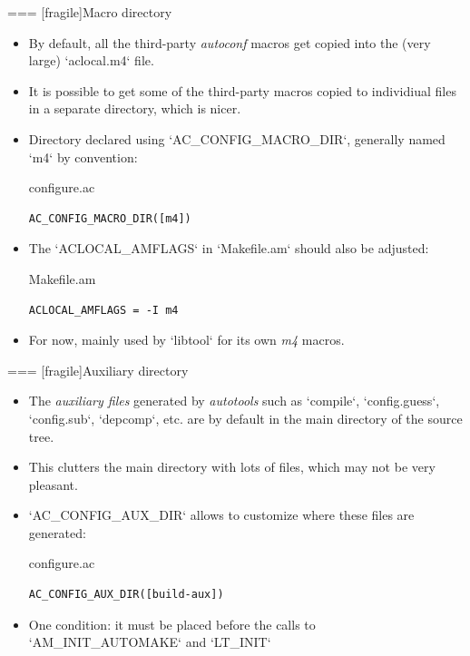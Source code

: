 === [fragile]{Macro directory}

  \begin{itemize}

  \item By default, all the third-party {\em autoconf} macros get
    copied into the (very large) `aclocal.m4` file.

  \item It is possible to get some of the third-party macros copied to
    individiual files in a separate directory, which is nicer.

  \item Directory declared using `AC_CONFIG_MACRO_DIR`, generally
    named `m4` by convention:
    \begin{block}{configure.ac}
      \begin{verbatim}
AC_CONFIG_MACRO_DIR([m4])
\end{verbatim}
\end{block}

\item The `ACLOCAL_AMFLAGS` in `Makefile.am` should also be
  adjusted:

\begin{block}{Makefile.am}
  \begin{verbatim}
ACLOCAL_AMFLAGS = -I m4
\end{verbatim}
\end{block}

\item For now, mainly used by `libtool` for its own {\em m4}
  macros.

  \end{itemize}



=== [fragile]{Auxiliary directory}

  \begin{itemize}

  \item The {\em auxiliary files} generated by {\em autotools} such as
    `compile`, `config.guess`, `config.sub`,
    `depcomp`, etc. are by default in the main directory of the
    source tree.

  \item This clutters the main directory with lots of files, which may
    not be very pleasant.

  \item `AC_CONFIG_AUX_DIR` allows to customize where these files
    are generated:
    \begin{block}{configure.ac}
      \begin{verbatim}
AC_CONFIG_AUX_DIR([build-aux])
\end{verbatim}
\end{block}

\item One condition: it must be placed before the calls to
  `AM_INIT_AUTOMAKE` and `LT_INIT`

  \end{itemize}



